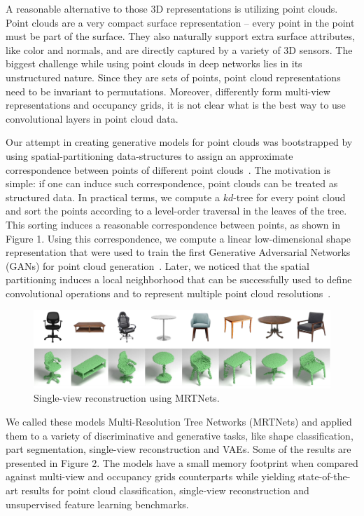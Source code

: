 A reasonable alternative to those 3D representations is utilizing point clouds.
Point clouds are a very compact surface representation -- every point in the point must be part of the surface.
They also naturally support extra surface attributes, like color and normals, and are directly captured by a variety of 3D sensors.
The biggest challenge while using point clouds in deep networks lies in its unstructured nature.
Since they are sets of points, point cloud representations need to be invariant to permutations.
Moreover, differently form multi-view representations and occupancy grids, it is not clear what is the best way to use convolutional layers in point cloud data.

Our attempt in creating generative models for point clouds was bootstrapped by using spatial-partitioning data-structures to assign an approximate correspondence between points of
different point clouds~\cite{pcagan}.
The motivation is simple: if one can induce such correspondence, point clouds can be treated as structured data.
In practical terms, we compute a $kd$-tree for every point cloud and sort the points according to a level-order traversal in the leaves of the tree.
This sorting induces a reasonable correspondence between points, as shown in Figure 1.
Using this correspondence, we compute a linear low-dimensional shape representation that were used to
train the first Generative Adversarial Networks (GANs) for point cloud generation~\cite{pcagan}.
Later, we noticed that the spatial partitioning induces a local neighborhood that can be successfully
used to define convolutional operations and to represent multiple point cloud resolutions~\cite{mrt}.
\begin{figure}
\vspace{-20pt}
 \begin{center}
 \includegraphics[width=\linewidth]{figs/mrtresults.png}
 \end{center}
 \vspace{-20pt}
 \caption{\small Single-view reconstruction using MRTNets.}
 \vspace{-5pt}
\end{figure}
We called these models Multi-Resolution Tree Networks (MRTNets) and applied them to a variety of
discriminative and generative tasks, like shape classification, 
part segmentation, single-view reconstruction and VAEs.
Some of the results are presented in Figure 2.
The models have a small memory footprint when compared against multi-view and occupancy grids counterparts while yielding state-of-the-art results for point cloud classification, single-view reconstruction and
unsupervised feature learning benchmarks.



